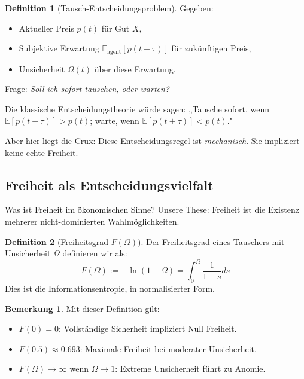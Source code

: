 \documentclass[a4paper,12pt]{article}
\theoremstyle{definition}
\newtheorem{definition}{Definition}
\newtheorem{bemerkung}{Bemerkung}
\begin{document}
\begin{definition}[Tausch-Entscheidungsproblem]
    Gegeben:
    \begin{itemize}
        \item Aktueller Preis $p(t)$ für Gut $X$,
        \item Subjektive Erwartung $\mathbb{E}_{\text{agent}}[p(t+\tau)]$ für zukünftigen Preis,
        \item Unsicherheit $\Omega(t)$ über diese Erwartung.
    \end{itemize}
    Frage: \emph{Soll ich sofort tauschen, oder warten?}
\end{definition}

Die klassische Entscheidungstheorie würde sagen: „Tausche sofort, wenn $\mathbb{E}[p(t+\tau)] > p(t)$; warte, wenn $\mathbb{E}[p(t+\tau)] < p(t)$."

Aber hier liegt die Crux: Diese Entscheidungsregel ist \emph{mechanisch}. Sie impliziert keine echte Freiheit.

\subsection{Freiheit als Entscheidungsvielfalt}

Was ist Freiheit im ökonomischen Sinne? Unsere These: Freiheit ist die Existenz mehrerer nicht-dominierten Wahlmöglichkeiten.

\begin{definition}[Freiheitsgrad $F(\Omega)$]
    Der Freiheitsgrad eines Tauschers mit Unsicherheit $\Omega$ definieren wir als:
    \begin{equation}
        F(\Omega) := -\ln(1 - \Omega) = \int_0^{\Omega} \frac{1}{1-s} ds
    \end{equation}
    Dies ist die Informationsentropie, in normalisierter Form.
\end{definition}

\begin{bemerkung}
    Mit dieser Definition gilt:
    \begin{itemize}
        \item $F(0) = 0$: Vollständige Sicherheit impliziert Null Freiheit.
        \item $F(0.5) \approx 0.693$: Maximale Freiheit bei moderater Unsicherheit.
        \item $F(\Omega) \to \infty$ wenn $\Omega \to 1$: Extreme Unsicherheit führt zu Anomie.
    \end{itemize}
\end{bemerkung}
\end{document}
